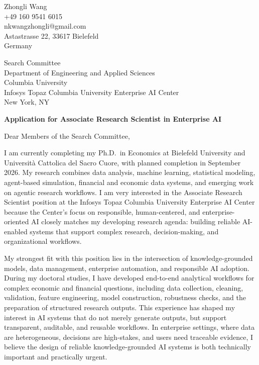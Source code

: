 \documentclass[11pt]{article}
\begin{document}
\begin{flushright}
Zhongli Wang \\
+49 160 9541 6015 \\
nkwangzhongli@gmail.com \\
Astastrasse 22, 33617 Bielefeld \\
Germany \\
\end{flushright}

\vspace{0.1cm}

\noindent
Search Committee \\
Department of Engineering and Applied Sciences \\
Columbia University \\
Infosys Topaz Columbia University Enterprise AI Center \\
New York, NY \\

\vspace{0.1cm}

\noindent
\textbf{Application for Associate Research Scientist in Enterprise AI} \\

\vspace{0.05cm}

\noindent Dear Members of the Search Committee,

I am currently completing my Ph.D.\ in Economics at Bielefeld University and Universit\`a Cattolica del Sacro Cuore, with planned completion in September 2026. My research combines data analysis, machine learning, statistical modeling, agent-based simulation, financial and economic data systems, and emerging work on agentic research workflows. I am very interested in the Associate Research Scientist position at the Infosys Topaz Columbia University Enterprise AI Center because the Center's focus on responsible, human-centered, and enterprise-oriented AI closely matches my developing research agenda: building reliable AI-enabled systems that support complex research, decision-making, and organizational workflows.

My strongest fit with this position lies in the intersection of knowledge-grounded models, data management, enterprise automation, and responsible AI adoption. During my doctoral studies, I have developed end-to-end analytical workflows for complex economic and financial questions, including data collection, cleaning, validation, feature engineering, model construction, robustness checks, and the preparation of structured research outputs. This experience has shaped my interest in AI systems that do not merely generate outputs, but support transparent, auditable, and reusable workflows. In enterprise settings, where data are heterogeneous, decisions are high-stakes, and users need traceable evidence, I believe the design of reliable knowledge-grounded AI systems is both technically important and practically urgent.
\end{document}
